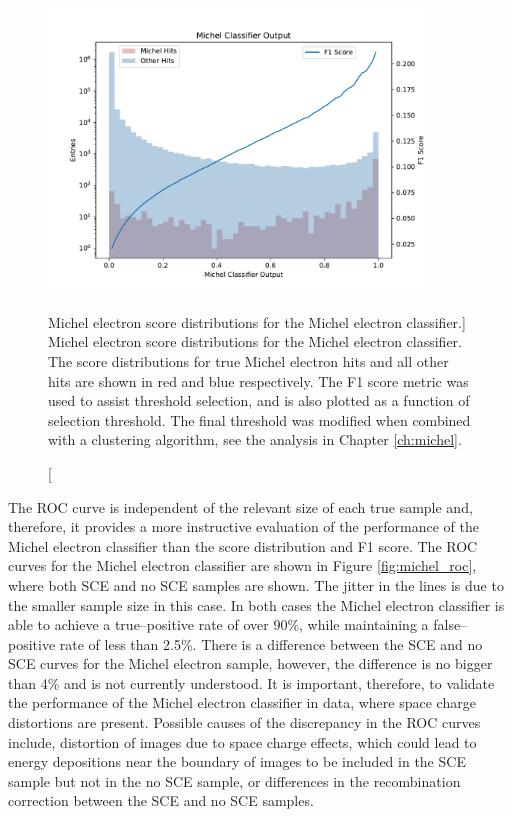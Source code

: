 \begin{figure}
	\centering
	\includegraphics[width=0.9\textwidth]{figures/michel_combined.pdf} 
	\caption
	[Michel electron score distributions for the Michel electron classifier.]
	{Michel electron score distributions for the Michel electron classifier. The
	score distributions for true Michel electron hits and all other hits are shown
	in red and blue respectively. The F1 score metric was used to assist 
	threshold selection, and is also plotted as a function of selection 
	threshold. The final threshold was modified when combined with a clustering 
	algorithm, see the analysis in Chapter \ref{ch:michel}.}
	\label{fig:michel_output}
\end{figure}

The ROC curve is independent of the relevant size of each true sample and,
therefore, it provides a more instructive evaluation of the performance of the
Michel electron classifier than the score distribution and F1 score. The ROC 
curves for the Michel electron classifier are shown in Figure 
\ref{fig:michel_roc}, where both SCE and no SCE samples are shown. The jitter 
in the lines is due to the smaller sample size in this case. In both cases the 
Michel electron classifier is able to achieve a true--positive rate of over 
90\%, while maintaining a false--positive rate of less than 2.5\%. There is a 
difference between the SCE and no SCE curves for the Michel electron sample, 
however, the difference is no bigger than 4\% and is not currently 
understood. It is important, therefore, to validate the performance of the 
Michel electron classifier in data, where space charge distortions are 
present. Possible causes of the discrepancy in the ROC curves include, 
distortion of images due to space charge effects, which could lead to energy 
depositions near the boundary of images to be included in the SCE sample but 
not in the no SCE sample, or differences in the recombination correction 
between the SCE and no SCE samples.

